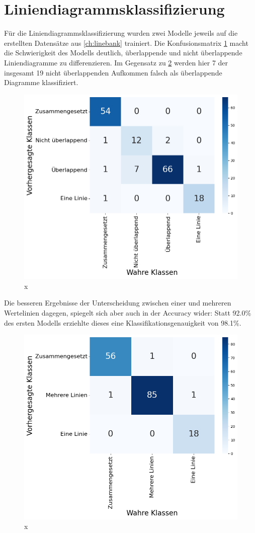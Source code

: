 \section{Liniendiagrammsklassifizierung}
\label{ch:classify_eval}

Für die Liniendiagrammsklassifizierung wurden zwei Modelle jeweils auf die erstellten Datensätze aus \ref{ch:linebank} trainiert. Die Konfusionsmatrix \ref{fig:val_v1_matrix} macht die Schwierigkeit des Modells deutlich, überlappende und nicht überlappende Liniendiagramme zu differenzieren. Im Gegensatz zu \ref{fig:val_v2_matrix} werden hier 7 der insgesamt 19 nicht überlappenden Aufkommen falsch als überlappende Diagramme klassifiziert.

\begin{figure}[H]
    \centering
    \captionsetup{width=.75\linewidth}
    \includegraphics[width=.75\textwidth]{Experimente/img/classify/val_v1/matrix.png}
    \caption{ x}
    \label{fig:val_v1_matrix}
\end{figure}

Die besseren Ergebnisse der Unterscheidung zwischen einer und mehreren Wertelinien dagegen, spiegelt sich aber auch in der Accuracy wider: Statt 92.0\% des ersten Modells erziehlte dieses eine Klassifikationsgenauigkeit von 98.1\%.

\begin{figure}[H]
    \centering
    \captionsetup{width=.75\linewidth}
    \includegraphics[width=.75\textwidth]{Experimente/img/classify/val_v2/matrix.png}
    \caption{ x}
    \label{fig:val_v2_matrix}
\end{figure}

